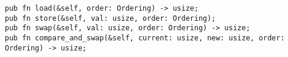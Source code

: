 \begin{lstlisting}[label=lst:atomicusize,caption=Signatures for selected operations on
\code{AtomicUsize}]
pub fn load(&self, order: Ordering) -> usize;
pub fn store(&self, val: usize, order: Ordering);
pub fn swap(&self, val: usize, order: Ordering) -> usize;
pub fn compare_and_swap(&self, current: usize, new: usize, order: Ordering) -> usize;
\end{lstlisting}
